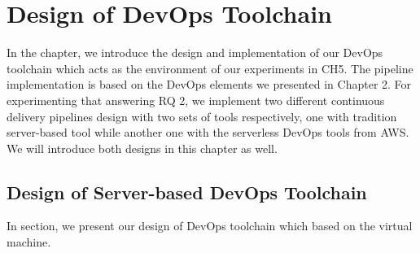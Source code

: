 \chapter{Design of DevOps Toolchain}
In the chapter, we introduce the design and implementation of our DevOps toolchain which acts as the environment of our experiments in CH5. The pipeline implementation is based on the DevOps elements we presented in Chapter 2. For experimenting that answering RQ 2, we implement two different continuous delivery pipelines design with two sets of tools respectively, one with tradition server-based tool while another one with the serverless DevOps tools from AWS. We will introduce both designs in this chapter as well.

\section{Design of Server-based DevOps Toolchain}
In section, we present our design of DevOps toolchain which based on the virtual machine.
